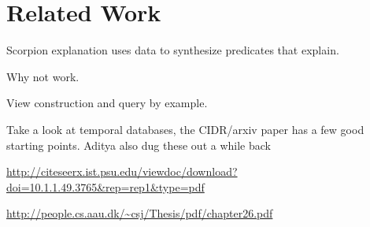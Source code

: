 \section{Related Work}
\label{s:related}


Scorpion explanation uses data to synthesize predicates that explain.

Why not work.

View construction and query by example.

Take a look at temporal databases, the CIDR/arxiv paper has a few good starting points. Aditya also dug these out a while back

\url{http://citeseerx.ist.psu.edu/viewdoc/download?doi=10.1.1.49.3765&rep=rep1&type=pdf}

\url{http://people.cs.aau.dk/~csj/Thesis/pdf/chapter26.pdf}
